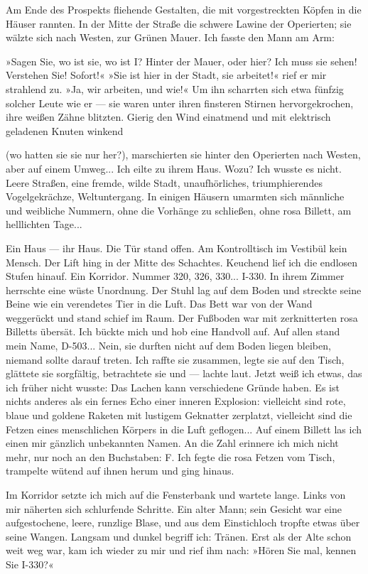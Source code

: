 Am Ende des Prospekts fliehende Gestalten, die mit vorgestreckten
Köpfen in die Häuser rannten. In der Mitte der Straße die schwere
Lawine der Operierten; sie wälzte sich nach Westen, zur Grünen
Mauer. Ich fasste den Mann am Arm:

»Sagen Sie, wo ist sie, wo ist I? Hinter der Mauer, oder hier? Ich
muss sie sehen! Verstehen Sie! Sofort!« »Sie ist hier in der Stadt,
sie arbeitet!« rief er mir strahlend zu. »Ja, wir arbeiten, und
wie!« Um ihn scharrten sich etwa fünfzig solcher Leute wie er — sie
waren unter ihren finsteren Stirnen hervorgekrochen, ihre weißen
Zähne blitzten. Gierig den Wind einatmend und mit elektrisch
geladenen Knuten winkend

(wo hatten sie sie nur her?), marschierten sie hinter den
Operierten nach Westen, aber auf einem Umweg... Ich eilte zu ihrem
Haus. Wozu? Ich wusste es nicht. Leere Straßen, eine fremde, wilde
Stadt, unaufhörliches, triumphierendes Vogelgekrächze,
Weltuntergang. In einigen Häusern umarmten sich männliche und
weibliche Nummern, ohne die Vorhänge zu schließen, ohne rosa
Billett, am helllichten Tage...

Ein Haus — ihr Haus. Die Tür stand offen. Am Kontrolltisch im
Vestibül kein Mensch. Der Lift hing in der Mitte des Schachtes.
Keuchend lief ich die endlosen Stufen hinauf. Ein Korridor. Nummer
320, 326, 330... I-330. In ihrem Zimmer herrschte eine wüste
Unordnung. Der Stuhl lag auf dem Boden und streckte seine Beine wie
ein verendetes Tier in die Luft. Das Bett war von der Wand
weggerückt und stand schief im Raum. Der Fußboden war mit
zerknitterten rosa Billetts übersät. Ich bückte mich und hob eine
Handvoll auf. Auf allen stand mein Name, D-503... Nein, sie durften
nicht auf dem Boden liegen bleiben, niemand sollte darauf treten.
Ich raffte sie zusammen, legte sie auf den Tisch, glättete sie
sorgfältig, betrachtete sie und — lachte laut. Jetzt weiß ich
etwas, das ich früher nicht wusste: Das Lachen kann verschiedene
Gründe haben. Es ist nichts anderes als ein fernes Echo einer
inneren Explosion: vielleicht sind rote, blaue und goldene Raketen
mit lustigem Geknatter zerplatzt, vielleicht sind die Fetzen eines
menschlichen Körpers in die Luft geflogen... Auf einem Billett las
ich einen mir gänzlich unbekannten Namen. An die Zahl erinnere ich
mich nicht mehr, nur noch an den Buchstaben: F. Ich fegte die rosa
Fetzen vom Tisch, trampelte wütend auf ihnen herum und ging
hinaus.

Im Korridor setzte ich mich auf die Fensterbank und wartete lange.
Links von mir näherten sich schlurfende Schritte. Ein alter Mann;
sein Gesicht war eine aufgestochene, leere, runzlige Blase, und aus
dem Einstichloch tropfte etwas über seine Wangen. Langsam und
dunkel begriff ich: Tränen. Erst als der Alte schon weit weg war,
kam ich wieder zu mir und rief ihm nach: »Hören Sie mal, kennen Sie
I-330?«

